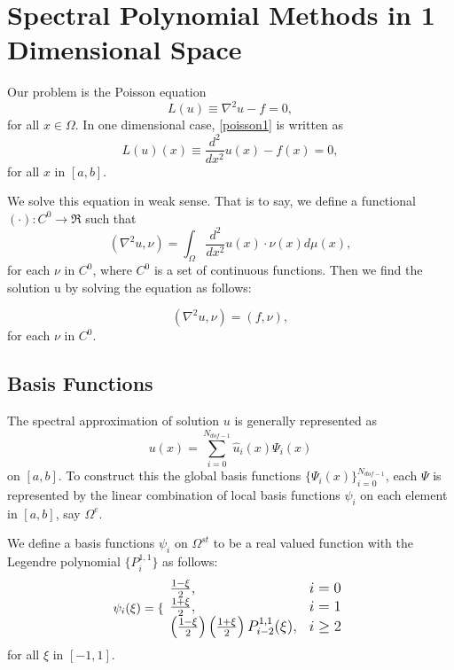 \section {Spectral Polynomial Methods in 1 Dimensional Space}

Our problem is the Poisson equation
\begin{equation}
\label{poisson1} L(u) \equiv  \nabla^2 u - f = 0,
\end{equation}
for all $x \in \Omega$. In one dimensional case, \ref{poisson1} is
written as
\begin{equation}
\label{poisson2} L(u)(x) \equiv \frac{d^2}{dx^2} u(x) - f(x) = 0,
\end{equation}
for all $x$ in $[a, b]$.

We solve this equation in weak sense. That is to say, we define a
functional $\left( \cdot \right) : C^0 \rightarrow \Re$ such that
\begin{equation}
\left(\nabla^2 u, \nu \right) = \int_{\Omega} \frac{d^2}{dx^2}
u(x) \cdot \nu(x) d\mu(x),
\end{equation}
for each $\nu$ in $C^0$, where $C^0$ is a set of continuous
functions. Then we find the solution u by solving the equation as
follows:

\begin{equation} \label{weakabs}
\left(\nabla^2 u, \nu \right) = \left(f, \nu\right),
\end{equation}
for each $\nu$ in $C^0$.

\subsection {Basis Functions}

The spectral approximation of solution $u$ is generally
represented as
\begin{equation}\label{genrep}
u(x) = \sum_{i=0}^{N_{dof-1}} \hat u_i(x)\Psi_i(x)
\end{equation}
on $[a, b]$. To construct this the global basis functions
$\{\Psi_i(x)\}_{i=0}^{N_{dof-1}}$, each $\Psi$ is represented by
the linear combination of local basis functions $\psi_i$ on each
element in $[a, b]$, say $\Omega^e$.

We define a basis functions ${\psi_i}$ on $\Omega^{st}$ to be a
real valued function with the Legendre polynomial $\{P_i^{1,1}\}$
as follows:
\begin{equation}\label{locbasis}
  \psi_i(\xi) =\large \{
  \begin{array}{ll}
  \frac{1-\xi}{2}, & i=0 \\
  \frac{1+\xi}{2}, & i=1 \\
  \left(\frac{1-\xi}{2}\right)\left(\frac{1+\xi}{2}\right)P_{i-2}^{1,1}(\xi),
  &i\ge 2
  \end{array}
\end{equation}
for all $\xi$ in $[-1, 1]$.

